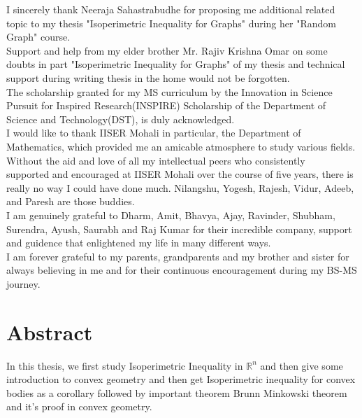 \documentclass[oneside]{book}
\begin{document}
I sincerely thank Neeraja Sahastrabudhe for proposing me additional related topic to my thesis "Isoperimetric Inequality for Graphs"  during her "Random Graph" course. \\

Support and help from my elder brother Mr. Rajiv Krishna Omar on some doubts in part "Isoperimetric Inequality for Graphs" of my thesis and technical support during writing thesis in the home would not be forgotten.\\

The scholarship granted for my MS curriculum by the Innovation in Science Pursuit for Inspired Research(INSPIRE) Scholarship of the Department of Science and Technology(DST), is duly acknowledged.\\


I would like to thank IISER Mohali in particular, the Department of Mathematics, which provided me an amicable atmosphere to study various fields. \\

Without the aid and love of all my intellectual peers who consistently \\supported and encouraged at IISER Mohali over the course of five years, there is really no way I could have done much. Nilangshu, Yogesh, Rajesh, Vidur, Adeeb, and Paresh are those buddies. 
\\

I am genuinely grateful to Dharm, Amit, Bhavya, Ajay, Ravinder, Shubham, Surendra, Ayush, Saurabh and Raj Kumar for their incredible company,
support and guidence that enlightened my life in many different ways.\\
 
I am forever grateful to my parents, grandparents and my brother and sister for always believing in me and for their continuous encouragement during my BS-MS journey.
\thispagestyle{empty}

\chapter*{Abstract}

In this thesis, we first study Isoperimetric Inequality in $\mathbb{R}^{n}$ and then give some introduction to convex geometry and then get Isoperimetric inequality for convex bodies as a corollary followed by important theorem Brunn Minkowski theorem and it's proof in convex geometry.
\end{document}
